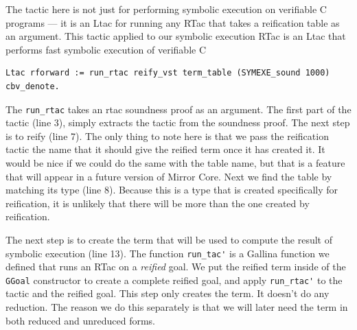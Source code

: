 \documentclass{puthesis}
\begin{document}
The tactic here is not just for performing symbolic execution on verifiable
C programs --- it is an Ltac for running any RTac that takes a
reification table as an argument. This tactic applied to our symbolic
execution RTac is an Ltac that performs fast symbolic execution of
verifiable C

\begin{lstlisting}
Ltac rforward := run_rtac reify_vst term_table (SYMEXE_sound 1000) cbv_denote.
\end{lstlisting}

The \lstinline|run_rtac| takes an rtac soundness proof as an
argument. The first part of the tactic (line 3), simply
extracts the tactic from the soundness proof. The next step is to
reify (line 7). The only thing to note here is that we pass the reification
tactic the name that it should give the reified term once it has
created it. It would be nice if we could do the same with the table
name, but that is a feature that will appear in a future version of
Mirror Core. Next we find the table by matching its type (line 8). Because this
is a type that is created specifically for reification, it is
unlikely that there will be more than the one created by reification. 

The next step is to create the term that will be used to compute the
result of symbolic execution (line 13). The function \lstinline|run_tac'| is a
Gallina function we defined that runs an RTac on a \emph{reified} goal. We put
the reified term inside of the \lstinline|GGoal| constructor to create
a complete reified goal, and apply \lstinline|run_rtac'| to the tactic
and the reified goal.  This step only creates the term. It doesn't do
any reduction. The reason we do this separately is that we will later
need the term in both reduced and unreduced forms. 
\end{document}

